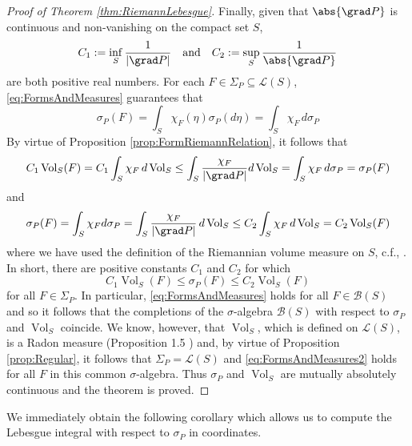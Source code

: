 \documentclass[11pt, letter]{book}
\newcommand{\Vol}{\operatorname{Vol}}
\begin{document}
\begin{proof}[Proof of Theorem \ref{thm:RiemannLebesgue}]
Finally, given that $\abs{\grad P}$ is continuous and non-vanishing on the compact set $S$,
\begin{equation*}
    C_1 := \inf_S\frac{1}{|\grad P|}\quad\mbox{and}\quad C_2 := \sup_{S}\frac{1}{\abs{\grad P }}
\end{equation*}
are both positive real numbers. For each $F\in \Sigma_P\subseteq\mathcal{L}(S)$, \eqref{eq:FormsAndMeasures} guarantees that
\begin{equation*}
    \sigma_P(F)=\int_S\chi_F(\eta)\sigma_P(d\eta)=\int_S \chi_F\,d\sigma_P
\end{equation*}
By virtue of Proposition \ref{prop:FormRiemannRelation}, it follows that
\begin{equation*}
C_1\Vol_S(F)=C_1\int_S \chi_F\,d\Vol_S\leq \int_S \frac{\chi_F}{|\grad P|}d\Vol_S=\int_S \chi_F\,d\sigma_P=\sigma_P(F)
\end{equation*}
and
\begin{equation*}
    \sigma_P(F)=\int_S\chi_F d\sigma_P=\int_S\frac{\chi_F}{|\grad P|}\,d\Vol_S\leq C_2\int_S\chi_F\,d\Vol_S=C_2\Vol_S(F)
\end{equation*}
where we have used the definition of the Riemannian volume measure on $S$, c.f., \cite{amann_analysis_2009}. In short, there are positive constants $C_1$ and $C_2$ for which
\begin{equation}\label{eq:FormsAndMeasures2}
    C_1\Vol_S(F)\leq\sigma_P(F)\leq C_2\Vol_S(F)
\end{equation}
for all $F\in\Sigma_P$. In particular, \eqref{eq:FormsAndMeasures} holds for all $F\in\mathcal{B}(S)$ and so it follows that the completions of the $\sigma$-algebra $\mathcal{B}(S)$ with respect to $\sigma_P$ and $\Vol_S$ coincide. We know, however, that $\Vol_S$, which is defined on $\mathcal{L}(S)$, is a Radon measure (Proposition 1.5 \cite[Chapter XII]{amann_analysis_2009}) and, by virtue of Proposition \ref{prop:Regular}, it follows that $\Sigma_P=\mathcal{L}(S)$ and \eqref{eq:FormsAndMeasures2} holds for all $F$ in this common $\sigma$-algebra. Thus $\sigma_P$ and $\Vol_S$ are mutually absolutely continuous and the theorem is proved.
\end{proof}

\noindent We immediately obtain the following corollary which allows us to compute the Lebesgue integral with respect to $\sigma_P$ in coordinates.
\end{document}
